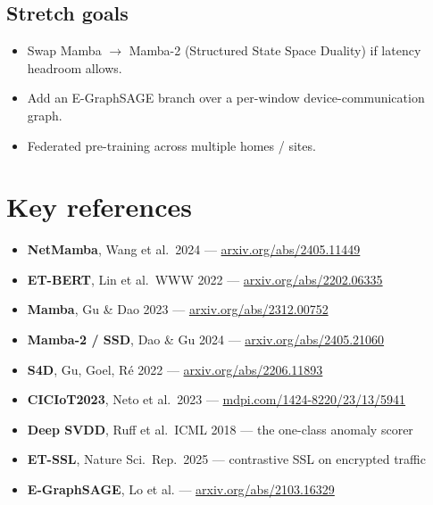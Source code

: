 \documentclass[11pt,a4paper]{article}
\begin{document}
\subsection{Stretch goals}
\begin{itemize}[leftmargin=*, itemsep=1pt]
  \item Swap Mamba $\to$ Mamba-2 (Structured State Space Duality) if latency headroom allows.
  \item Add an E-GraphSAGE branch over a per-window device-communication graph.
  \item Federated pre-training across multiple homes / sites.
\end{itemize}

\section{Key references}
\footnotesize
\begin{itemize}[leftmargin=*, itemsep=1pt]
  \item \textbf{NetMamba}, Wang et al.\ 2024 --- \href{https://arxiv.org/abs/2405.11449}{arxiv.org/abs/2405.11449}
  \item \textbf{ET-BERT}, Lin et al.\ WWW 2022 --- \href{https://arxiv.org/abs/2202.06335}{arxiv.org/abs/2202.06335}
  \item \textbf{Mamba}, Gu \& Dao 2023 --- \href{https://arxiv.org/abs/2312.00752}{arxiv.org/abs/2312.00752}
  \item \textbf{Mamba-2 / SSD}, Dao \& Gu 2024 --- \href{https://arxiv.org/abs/2405.21060}{arxiv.org/abs/2405.21060}
  \item \textbf{S4D}, Gu, Goel, R\'e 2022 --- \href{https://arxiv.org/abs/2206.11893}{arxiv.org/abs/2206.11893}
  \item \textbf{CICIoT2023}, Neto et al.\ 2023 --- \href{https://www.mdpi.com/1424-8220/23/13/5941}{mdpi.com/1424-8220/23/13/5941}
  \item \textbf{Deep SVDD}, Ruff et al.\ ICML 2018 --- the one-class anomaly scorer
  \item \textbf{ET-SSL}, Nature Sci.\ Rep.\ 2025 --- contrastive SSL on encrypted traffic
  \item \textbf{E-GraphSAGE}, Lo et al. --- \href{https://arxiv.org/abs/2103.16329}{arxiv.org/abs/2103.16329}
\end{itemize}
\end{document}
